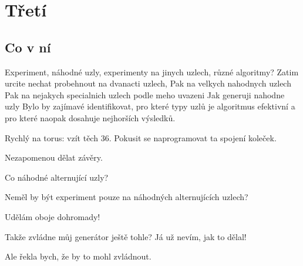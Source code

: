 
\chapter{Třetí}

\section{Co v ní}
Experiment, náhodné uzly, experimenty na jinych uzlech, různé algoritmy?
Zatim urcite nechat probehnout na dvanacti uzlech,
Pak na velkych nahodnych uzlech
Pak na nejakych specialnich uzlech podle meho uvazeni
Jak generuji nahodne uzly
Bylo by zajímavé identifikovat, pro které typy uzlů je algoritmus efektivní a pro které naopak dosahuje nejhorších výsledků.

Rychlý na torus: vzít těch 36.
Pokusit se naprogramovat ta spojení koleček.

Nezapomenou dělat závěry.

Co náhodné alternující uzly?

Neměl by být experiment pouze na náhodných alternujících uzlech?

Udělám oboje dohromady!

Takže zvládne můj generátor ještě tohle? Já už nevím, jak to dělal!

Ale řekla bych, že by to mohl zvládnout.
